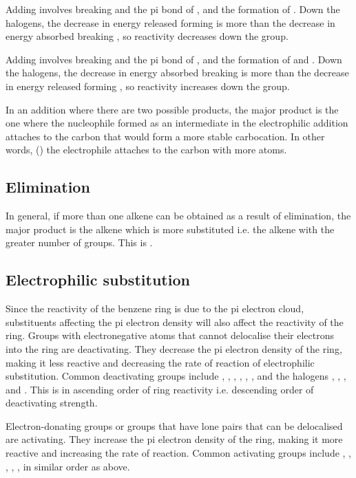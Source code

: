 \documentclass[Chemistry.tex]{subfiles}
\begin{document}
Adding  involves breaking  and the pi bond of , and the formation of . Down the halogens, the decrease in energy released forming  is more than the decrease in energy absorbed breaking , so reactivity decreases down the group.

Adding  involves breaking  and the pi bond of , and the formation of  and . Down the halogens, the decrease in energy absorbed breaking  is more than the decrease in energy released forming , so reactivity increases down the group.

In an addition where there are two possible products, the major product is the one where the nucleophile formed as an intermediate in the electrophilic addition attaches to the carbon that would form a more stable carbocation. In other words, () the electrophile attaches to the carbon with more  atoms.
\subsection{Elimination}
In general, if more than one alkene can be obtained as a result of elimination, the major product is the alkene which is more substituted i.e. the alkene with the greater number of  groups. This is .
\subsection{Electrophilic substitution}
Since the reactivity of the benzene ring is due to the pi electron cloud, substituents affecting the pi electron density will also affect the reactivity of the ring.
Groups with electronegative atoms that cannot delocalise their electrons into the ring are deactivating. They decrease the pi electron density of the ring, making it less reactive and decreasing the rate of reaction of electrophilic substitution. Common deactivating groups include , , , , , , and the halogens , , , and . This is in ascending order of ring reactivity i.e. descending order of deactivating strength.

Electron-donating groups or groups that have lone pairs that can be delocalised are activating. They increase the pi electron density of the ring, making it more reactive and increasing the rate of reaction. Common activating groups include , , , , , in similar order as above.
\end{document}
